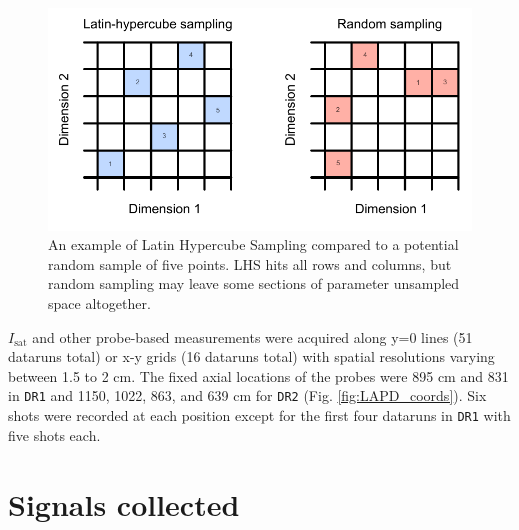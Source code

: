 \begin{figure}
	\centering
	\includegraphics[width=350pt]{figures/lhs.pdf}
	\caption[A demonstration of Latin-hypercube sampling vs random sampling]{\label{fig:lhs-vs-random}An example of Latin Hypercube Sampling compared to a potential random sample of five points. LHS hits all rows and columns, but random sampling may leave some sections of parameter unsampled space altogether.}
\end{figure}

$I_\text{sat}$ and other probe-based measurements were acquired along y=0 lines (51 dataruns total) or x-y grids (16 dataruns total) with spatial resolutions varying between 1.5 to 2 cm. The fixed axial locations of the probes were 895 cm and 831 in \texttt{DR1} and 1150, 1022, 863, and 639 cm for \texttt{DR2} (Fig. \ref{fig:LAPD_coords}). Six shots were recorded at each position except for the first four dataruns in \texttt{DR1} with five shots each.

\section{Signals collected}

